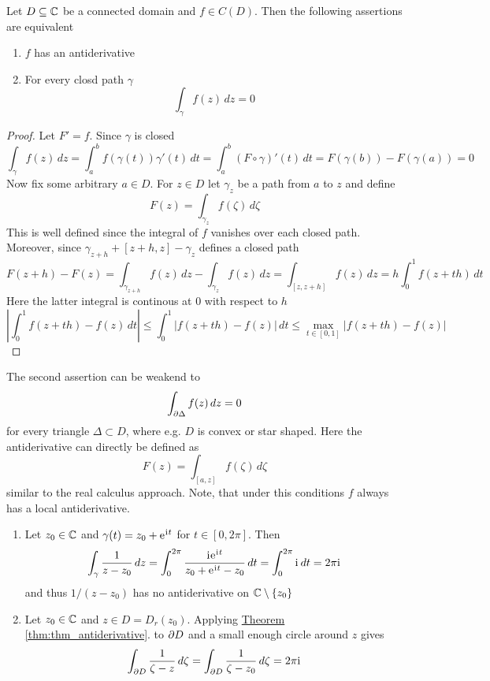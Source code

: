 \begin{theorem}\label{thm:thm_antiderivative}
Let \( D \subseteq \mathbb{C} \) be a connected domain and \( f \in C(D)\). Then the following assertions are equivalent
\begin{enumerate}
	\item \( f \) has an antiderivative
	\item For every closd path \( \gamma \)
		\[
			\int_{\gamma} f(z)\,dz = 0
		\]
\end{enumerate}
\end{theorem}

\begin{proof} Let \( F' = f \). Since \( \gamma \) is closed
	\[
		\int_\gamma f(z)\,dz
			  = \int_a^b f(\gamma(t))\gamma'(t)\,dt 
			  = \int_a^b (F\circ\gamma)'(t)\,dt 
			  = F(\gamma(b)) - F(\gamma(a)) = 0
	\]
Now fix some arbitrary \( a \in D \). For \( z \in D \) let \( \gamma_z \) be a path from \( a \) to \( z \) 
and define
\[
	F(z) = \int_{\gamma_z} f(\zeta)\,d\zeta
\]
This is well defined since the integral of \( f \) vanishes over each closed path. Moreover, since
\( \gamma_{z + h} + [z + h,z] - \gamma_z \) defines a closed path
\[
	F(z + h) - F(z)
		= \int_{\gamma_{z + h}} f(z)\,dz - \int_{\gamma_z} f(z)\,dz
		= \int_{[z,z + h]} f(z)\,dz
		= h\int_0^1 f(z + th)\,dt
\]
Here the latter integral is continous at \( 0 \) with respect to \( h \)
\[
	\left|\int_0^1 f(z + th) - f(z)\,dt\right| 
		\le \int_0^1 |f(z + th) - f(z)|\,dt 
		\le \max_{t \in [0,1]}|f(z + th) - f(z)|
\]
\end{proof}
\bigskip


\begin{corollary}The second assertion can be weakend to 
\[
	\int_{\partial\Delta} f(z)\,dz = 0
\]
for every triangle \( \Delta \subset D\), where e.g. \( D \) is convex or star shaped. Here the antiderivative
can directly be defined as 
\[
	F(z) = \int_{[a,z]} f(\zeta)\,d\zeta
\]
similar to the real calculus approach. Note, that under this conditions \( f \) always has a local antiderivative.
\end{corollary}
\bigskip


\begin{examples}\hfill
    \begin{enumerate}
        \item Let \( z_0 \in \mathbb{C} \) and \( \gamma(t) = z_0 + \mathrm{e}\mkern1mu^{\mathrm{i}\mkern1mu t} \) for \( t \in [0, 2\pi] \). Then
			\[
				\int_\gamma \frac{1}{z - z_0}\,dz 
					= \int_0^{2\pi} \frac{\mathrm{i}\mkern1mu \mathrm{e}\mkern1mu^{\mathrm{i}\mkern1mu t}}{z_0 + \mathrm{e}\mkern1mu^{\mathrm{i}\mkern1mu t} - z_0}\,dt
					= \int_0^{2\pi} \mathrm{i}\mkern1mu\,dt
					= 2\pi\mathrm{i}\mkern1mu
			\]
			and thus \( 1/ (z - z_0 ) \) has no antiderivative on \( \mathbb{C} \setminus \{z_0\} \)
        \item Let \( z_0 \in \mathbb{C} \) and \( z \in D = D_r(z_0) \). Applying 
			\hyperref[thm:thm_antiderivative]{Theorem \ref*{thm:thm_antiderivative}}. 
			to \( \partial D \) and a small enough circle around \( z \) gives
			\[
				\int_{\partial D} \frac{1}{\zeta - z}\,d\zeta
					= \int_{\partial D} \frac{1}{\zeta - z_0}\,d\zeta
					= 2\pi\mathrm{i}\mkern1mu
			\]
    \end{enumerate}
\end{examples}
\bigskip


